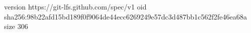 version https://git-lfs.github.com/spec/v1
oid sha256:98b22afd15bd189f0f9064de44ecc6269249e57dc3d487bb1c562f2fe46ea68a
size 306
